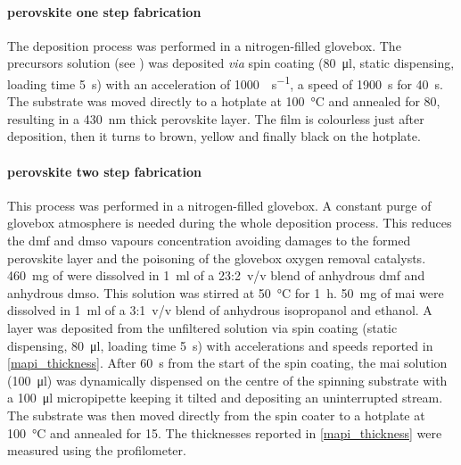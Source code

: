 		\paragraph{ perovskite one step fabrication}
		The deposition process was performed in a nitrogen-filled glovebox.
		The precursors solution (see ) was deposited \textit{via} spin coating (\SI{80}{\ul}, static dispensing, loading time \SI{5}{\s}) with an acceleration of \SI{1000}{\rpm\per\s}, a speed of \SI{1900}{\s} for \SI{40}{\s}.
		The substrate was moved directly to a hotplate at \SI{100}{\celsius} and annealed for \SI{80}{\min}, resulting in a \SI{430}{\nm} thick perovskite layer.
		The film is colourless just after deposition, then it turns to brown, yellow and finally black on the hotplate.

		\FloatBarrier
		\paragraph{ perovskite two step fabrication}
		This process was performed in a nitrogen-filled glovebox.
		A constant purge of glovebox atmosphere is needed during the whole deposition process.
		This reduces the \gls{dmf} and \gls{dmso} vapours concentration avoiding damages to the formed perovskite layer and the poisoning of the glovebox oxygen removal catalysts.
		\SI{460}{\mg} of  were dissolved in \SI{1}{\ml} of a 23:2~v/v blend of anhydrous \gls{dmf} and anhydrous \gls{dmso}.
		This solution was stirred at \SI{50}{\celsius} for \SI{1}{\hour}.
		\SI{50}{\mg} of \gls{mai} were dissolved in \SI{1}{\ml} of a 3:1~v/v blend of anhydrous isopropanol and ethanol.
		A  layer was deposited from the unfiltered solution via spin coating (static dispensing, \SI{80}{\ul}, loading time \SI{5}{\s}) with accelerations and speeds reported in \cref{mapi_thickness}.
		After \SI{60}{\s} from the start of the spin coating, the \gls{mai} solution (\SI{100}{\ul}) was dynamically dispensed on the centre of the spinning substrate with a \SI{100}{\ul} micropipette keeping it tilted and depositing an uninterrupted stream.
		The substrate was then moved directly from the spin coater to a hotplate at \SI{100}{\celsius} and annealed for \SI{15}{\min}.
		The thicknesses reported in \cref{mapi_thickness} were measured using the profilometer.

